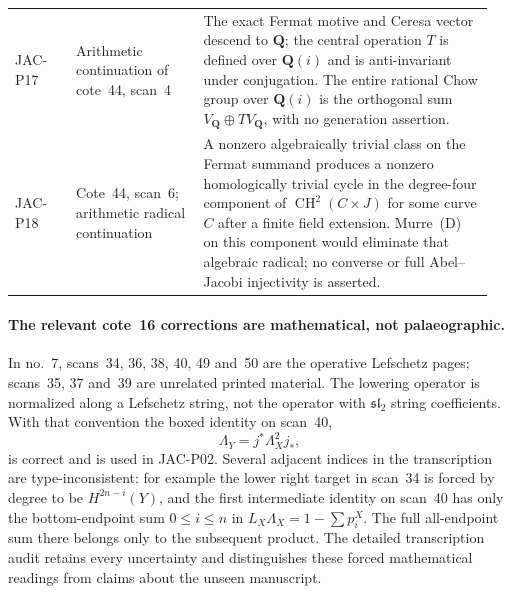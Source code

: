 \begin{longtable}{@{}p{0.12\linewidth}p{0.25\linewidth}p{0.58\linewidth}@{}}
JAC-P17 & Arithmetic continuation of cote~44, scan~4 &
The exact Fermat motive and Ceresa vector descend to $\mathbf Q$;
the central operation $T$ is defined over $\mathbf Q(i)$ and is
anti-invariant under conjugation. The entire rational Chow group
over $\mathbf Q(i)$ is the orthogonal sum $V_{\mathbf Q}\oplus
T V_{\mathbf Q}$, with no generation assertion.\\
JAC-P18 & Cote~44, scan~6; arithmetic radical continuation &
A nonzero algebraically trivial class on the Fermat summand
produces a nonzero homologically trivial cycle in the degree-four
component of $\operatorname{CH}^2(C\times J)$ for some curve $C$
after a finite field extension. Murre~(D) on this component would
eliminate that algebraic radical; no converse or full
Abel--Jacobi injectivity is asserted.\\
\bottomrule
\end{longtable}
\endgroup

\paragraph{The relevant cote~16 corrections are mathematical, not palaeographic.}
In no.~7, scans~34, 36, 38, 40, 49 and~50 are the operative
Lefschetz pages; scans~35, 37 and~39 are unrelated printed
material. The lowering operator is normalized along a Lefschetz
string, not the operator with $\mathfrak{sl}_2$ string
coefficients. With that convention the boxed identity on scan~40,
\[
             \Lambda_Y=j^*\Lambda_X^2j_*,
\]
is correct and is used in JAC-P02. Several adjacent indices in
the transcription are type-inconsistent: for example the lower
right target in scan~34 is forced by degree to be
$H^{2n-i}(Y)$, and the first intermediate identity on scan~40
has only the bottom-endpoint sum $0\le i\le n$ in
$L_X\Lambda_X=1-\sum p_i^X$. The full all-endpoint sum there
belongs only to the subsequent product. The detailed
transcription audit retains every uncertainty and distinguishes
these forced mathematical readings from claims about the
unseen manuscript.
